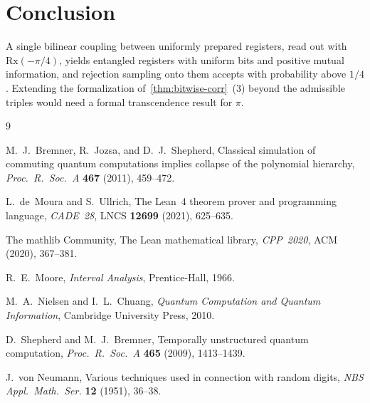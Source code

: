 \documentclass[11pt,a4paper]{article}
\theoremstyle{plain}
\theoremstyle{definition}
\theoremstyle{remark}
\begin{document}
\clearpage
\section{Conclusion}\label{sec:conclusion}

A single bilinear coupling between uniformly prepared registers, read out with
\( \mathrm{Rx}(-\pi / 4) \), yields entangled registers with uniform bits and positive mutual
information, and rejection sampling onto them accepts with probability above \( 1/4 \). Extending
the formalization of~\cref{thm:bitwise-corr}~(3) beyond the admissible triples would need a
formal transcendence result for \( \pi \).

\clearpage
\begin{thebibliography}{9}

  M.~J.~Bremner, R.~Jozsa, and D.~J.~Shepherd,
  Classical simulation of commuting quantum computations implies collapse of the polynomial
  hierarchy, \emph{Proc.\ R.\ Soc.\ A} \textbf{467} (2011), 459--472.

  L.~de~Moura and S.~Ullrich,
  The Lean~4 theorem prover and programming language, \emph{CADE~28}, LNCS \textbf{12699}
  (2021), 625--635.

  The mathlib Community,
  The Lean mathematical library, \emph{CPP~2020}, ACM (2020), 367--381.

  R.~E.~Moore, \emph{Interval Analysis}, Prentice-Hall, 1966.

  M.~A.~Nielsen and I.~L.~Chuang,
  \emph{Quantum Computation and Quantum Information}, Cambridge University Press, 2010.

  D.~Shepherd and M.~J.~Bremner,
  Temporally unstructured quantum computation, \emph{Proc.\ R.\ Soc.\ A} \textbf{465} (2009),
  1413--1439.

  J.~von Neumann,
  Various techniques used in connection with random digits, \emph{NBS Appl.\ Math.\ Ser.}
  \textbf{12} (1951), 36--38.

\end{thebibliography}
\end{document}
